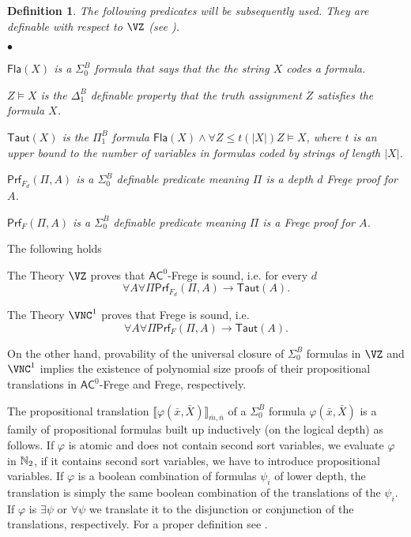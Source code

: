 \documentclass{LMCS}
\newcommand{\Nat}{\ensuremath \mathbb N}
\newcommand{\abs}[1]{\left\vert#1\right\vert}
\newtheorem{definition}{Definition}[section]
\begin{document}
\begin{definition}The following predicates will be subsequently used. They are definable with respect to $\VZ$
 (see \cite{Kra95}).
  \begin{iteMize}{$\bullet$}
    \item $\mathsf{Fla}(X)$ is a $\Sigma^B_0$ formula that says that the the string $X$ codes a
    formula.
    \item $Z\models X$ is the $\Delta^B_1$ definable property that the truth assignment $Z$ satisfies the formula $X$.
    \item $\mathsf{Taut}(X)$ is the $\Pi^B_1$ formula $\mathsf{Fla}(X)\land \forall Z\leq t(\abs{X}) Z\models
    X$, where $t$ is an upper bound to the number of variables in formulas coded by strings of length $\abs{X}$.
    \item $\mathsf{Prf}_{F_d}(\Pi,A)$ is a $\Sigma^B_0$ definable predicate meaning $\Pi$ is a
    depth $d$ Frege proof for $A$.
    \item $\mathsf{Prf}_{F}(\Pi,A)$ is a $\Sigma^B_0$ definable predicate meaning $\Pi$ is a Frege
    proof for $A$.
  \end{iteMize}
\end{definition}

The following holds

\begin{fact}\label{fact:VZ and bd Frege}
  The Theory $\VZ$ proves that $\mathsf{AC}^0$-Frege is sound, i.e. for every $d$ $$\forall A\forall\Pi
  \mathsf{Prf}_{F_d}(\Pi,A)\rightarrow \mathsf{Taut}(A).$$
\end{fact}

\begin{fact}\label{fact:VNC1 and NC1 Frege}
  The Theory $\VNC^1$ proves that Frege is sound, i.e. $$\forall A\forall\Pi
  \mathsf{Prf}_{F}(\Pi,A)\rightarrow \mathsf{Taut}(A).$$
\end{fact}

On the other hand, provability of the universal closure of $\Sigma^B_0$ formulas in $\VZ$ and $\VNC^1$ implies
the existence of polynomial size proofs of their propositional translations in $\mathsf{AC}^0$-Frege and Frege,
respectively.

The propositional translation $\llbracket\varphi(\bar x,\bar X)\rrbracket_{\bar m,\bar n}$ of a $\Sigma^B_0$
formula $\varphi(\bar x,\bar X)$ is a family of propositional formulas built up inductively (on the logical
depth) as follows. If $\varphi$ is atomic and does not contain second sort variables, we evaluate $\varphi$ in
$\Nat_2$, if it contains second sort variables, we have to introduce propositional variables. If $\varphi$ is a
boolean combination of formulas $\psi_i$ of lower depth, the translation is simply the same boolean combination
of the translations of the $\psi_i$. If $\varphi$ is $\exists\psi$ or $\forall\psi$ we translate it to the
disjunction or conjunction of the translations, respectively. For a proper definition see \cite{CN10}.
\end{document}
